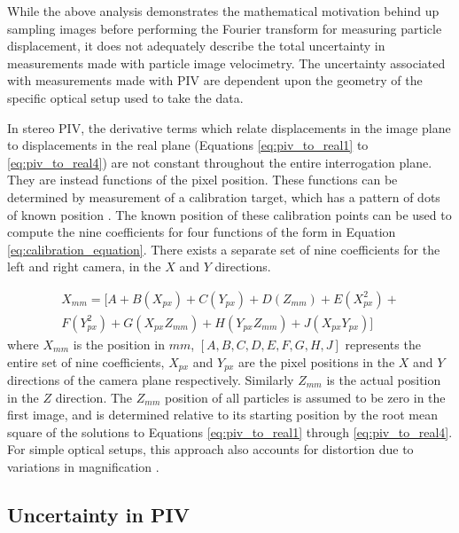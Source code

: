 

While the above analysis demonstrates the mathematical motivation behind up 
sampling images before performing the Fourier transform for measuring particle 
displacement, it does not adequately describe the total uncertainty in 
measurements made with particle image velocimetry. The uncertainty associated 
with measurements made with PIV are dependent upon the geometry of the specific 
optical setup used to take the data.

In stereo PIV,  the 
derivative terms which relate displacements in the image plane to displacements 
in the real plane (Equations \ref{eq:piv_to_real1} to \ref{eq:piv_to_real4}) 
are not constant throughout the entire interrogation plane. They are instead 
functions of the pixel position. These functions can be determined by 
measurement of a calibration target, which has a pattern of dots of known 
position . The known position of these calibration points can 
be used to compute the nine coefficients for four functions of the form in 
Equation \ref{eq:calibration_equation}. There exists a separate set of nine 
coefficients for the left and right camera, in the $X$ and $Y$ directions.

\begin{equation}
	\begin{multlined}
	X_{mm} =  [A + B(X_{px}) + C(Y_{px}) + D(Z_{mm}) + E(X_{px}^2) + \\
	F(Y_{px}^2) + G(X_{px}Z_{mm}) + H(Y_{px}Z_{mm}) + J(X_{px}Y_{px})]
	\end{multlined}
	\label{eq:calibration_equation}
\end{equation}
\newline
\noindent
where $X_{mm}$ is the position in $mm$, $[A, B, C, D, E, F, G, H, J]$ 
represents the entire set of nine coefficients, $X_{px}$ and $Y_{px}$ are the 
pixel positions in the $X$ and $Y$ directions of the camera plane 
respectively. Similarly $Z_{mm}$ is the actual position in the $Z$ direction. 
The 
$Z_{mm}$ position of all particles is assumed to be zero in the first image, 
and is determined relative to its starting position by the root mean square of 
the solutions to Equations \ref{eq:piv_to_real1} through \ref{eq:piv_to_real4}.
For simple optical setups, this approach also accounts for distortion due to 
variations in magnification \cite{soloff1997, willert1997}.

\subsection{Uncertainty in PIV}

